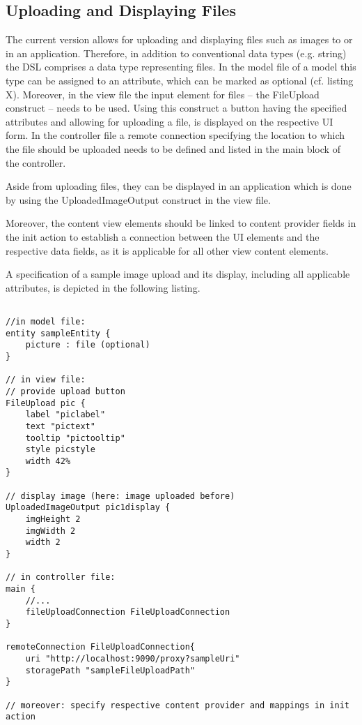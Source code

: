 
\subsection{Uploading and Displaying Files}
\label{subsec: UploadSaveDisplayWebServices}
The current \MD version allows for uploading and displaying files such as images to or in an application. Therefore, in addition to conventional data types (e.g. string) the DSL comprises a data type representing files. In the model file of a \MD model this type can be assigned to an attribute, which can be marked as optional (cf. listing X). Moreover, in the view file the input element for files -- the FileUpload construct -- needs to be used. Using this construct a button having the specified attributes and allowing for uploading a file, is displayed on the respective UI form. In the controller file a remote connection specifying the location to which the file should be uploaded needs to be defined and listed in the main block of the controller. 

Aside from uploading files, they can be displayed in an application which is done by using the UploadedImageOutput construct in the view file.

Moreover, the content view elements should be linked to content provider fields in the init action to establish a connection between the UI elements and the respective data fields, as it is applicable for all other view content elements.

A specification of a sample image upload and its display, including all applicable attributes, is depicted in the following listing.

\begin{lstlisting}

//in model file:
entity sampleEntity {
	picture : file (optional)
}

// in view file:
// provide upload button
FileUpload pic {
	label "piclabel"
	text "pictext"
	tooltip "pictooltip"		
	style picstyle
	width 42%
}		

// display image (here: image uploaded before)
UploadedImageOutput pic1display {
	imgHeight 2
	imgWidth 2
	width 2
}

// in controller file:
main {
	//...
	fileUploadConnection FileUploadConnection
}

remoteConnection FileUploadConnection{
	uri "http://localhost:9090/proxy?sampleUri"
	storagePath "sampleFileUploadPath"
}

// moreover: specify respective content provider and mappings in init action

\end{lstlisting}




